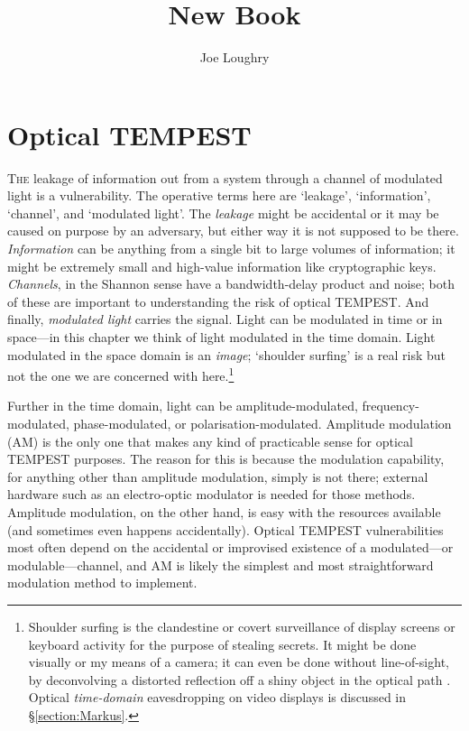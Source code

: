 \documentclass[a4paper,twoside,11pt,openany]{book}
\begin{document}
\title{New Book}
\author{Joe Loughry}
\setcounter{chapter}{6} %
\setcounter{page}{263} %
\thispagestyle{empty}
\chapter{Optical TEMPEST}
\lettrine[lines=3]{T}{he} leakage of information out from a system through a
channel of modulated light is a vulnerability. The operative terms here are
`leakage',
`information', `channel', and `modulated light'. The \emph{leakage} might be
accidental or it may be caused on purpose by an adversary, but either way it
is not
supposed to be there. \emph{Information} can be anything from a single bit to
large volumes of information; it might be extremely small and high-value
information like
cryptographic keys. \emph{Channels}, in the Shannon sense \cite{Shannon1948}
have a bandwidth-delay product and noise; both of these are important to
understanding the risk of optical TEMPEST. And finally, \emph{modulated light}
carries the signal. Light can be modulated in time or in space---in this
chapter we think of
light modulated in the time domain. Light modulated in the space domain is an
\emph{image}; `shoulder surfing' is a real risk but not the one we are
concerned with here.\footnote{Shoulder surfing is the clandestine or covert
surveillance of display screens or keyboard activity for the purpose of
stealing secrets. It might be done visually or my means of a camera; it can
even be done without line-of-sight, by deconvolving a distorted reflection off
a shiny object in the optical path
\cite{Backes2008,Backes2009a,Raguram2011,Jenkins2013a,Xu2013a}. Optical
\emph{time-domain} eavesdropping on video displays \cite{Kuhn2002} is discussed
in \S \ref{section:Markus}.}

Further in the time domain, light can be amplitude-modulated,
frequency-modulated, phase-modulated, or polarisation-modulated. Amplitude
modulation (AM) is the only one that makes any kind of practicable sense for
optical TEMPEST purposes. The reason for this is because the modulation
capability, for anything other than amplitude modulation, simply is not there;
external hardware such as an electro-optic modulator is needed for those
methods. Amplitude modulation, on the other hand, is easy with the resources
available (and sometimes even happens accidentally). Optical TEMPEST
vulnerabilities most often depend on the accidental or improvised existence of
a modulated---or modulable---channel, and AM is likely the simplest and most
straightforward modulation method to implement.
\end{document}
